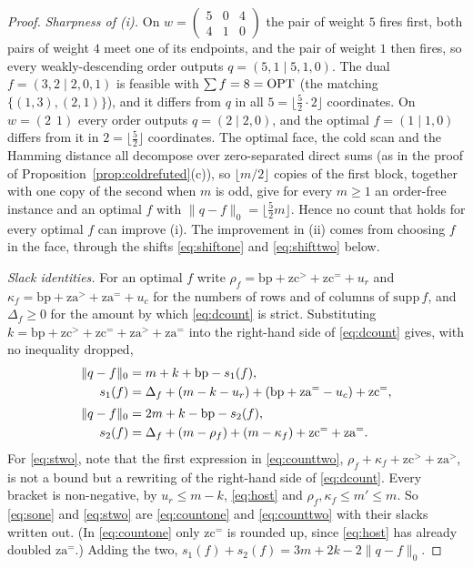 \begin{proof}
\emph{Sharpness of (i).} On
$w = \left(\begin{smallmatrix} 5&0&4\\ 4&1&0 \end{smallmatrix}\right)$ the pair of weight $5$ fires
first, both pairs of weight $4$ meet one of its endpoints, and the pair of weight $1$ then fires, so
every weakly-descending order outputs $q = (5,1 \mid 5,1,0)$. The dual $f = (3,2 \mid 2,0,1)$ is
feasible with $\sum f = 8 = \mathrm{OPT}$ (the matching $\{(1,3),(2,1)\}$), and it differs from $q$ in all
$5 = \lfloor \tfrac52 \cdot 2 \rfloor$ coordinates. On $w = (2\ \ 1)$ every order outputs
$q = (2 \mid 2, 0)$, and the optimal $f = (1 \mid 1, 0)$ differs from it in
$2 = \lfloor \tfrac52 \rfloor$ coordinates. The optimal face, the cold scan and the Hamming distance
all decompose over zero-separated direct sums (as in the proof of
Proposition~\ref{prop:coldrefuted}(c)), so $\lfloor m/2 \rfloor$ copies of the first block, together
with one copy of the second when $m$ is odd, give for every $m \ge 1$ an order-free instance and an
optimal $f$ with $\|q-f\|_0 = \lfloor \tfrac52 m \rfloor$. Hence no count that holds for every
optimal $f$ can improve (i). The improvement in (ii) comes from choosing $f$ in the face, through
the shifts \eqref{eq:shiftone} and \eqref{eq:shifttwo} below.

\emph{Slack identities.} For an optimal $f$ write
$\rho_f = \mathrm{bp}+\mathrm{zc}^>+\mathrm{zc}^=+u_r$ and
$\kappa_f = \mathrm{bp}+\mathrm{za}^>+\mathrm{za}^=+u_c$ for the numbers of rows and of columns of
$\mathrm{supp}\, f$, and $\Delta_f \ge 0$ for the amount by which \eqref{eq:dcount} is strict.
Substituting $k = \mathrm{bp}+\mathrm{zc}^>+\mathrm{zc}^=+\mathrm{za}^>+\mathrm{za}^=$ into the
right-hand side of \eqref{eq:dcount} gives, with no inequality dropped,
\begin{align}
  \|q-f\|_0 &= m+k+\mathrm{bp} - s_1(f), \notag\\
  s_1(f) &= \Delta_f + (m-k-u_r) + (\mathrm{bp}+\mathrm{za}^=-u_c) + \mathrm{zc}^= ,
  \label{eq:sone}\\[2pt]
  \|q-f\|_0 &= 2m+k-\mathrm{bp} - s_2(f), \notag\\
  s_2(f) &= \Delta_f + (m-\rho_f) + (m-\kappa_f) + \mathrm{zc}^= + \mathrm{za}^= .
  \label{eq:stwo}
\end{align}
For \eqref{eq:stwo}, note that the first expression in \eqref{eq:counttwo},
$\rho_f + \kappa_f + \mathrm{zc}^> + \mathrm{za}^>$, is not a bound but a rewriting of the
right-hand side of \eqref{eq:dcount}. Every bracket is non-negative, by $u_r \le m-k$,
\eqref{eq:host} and $\rho_f, \kappa_f \le m' \le m$. So \eqref{eq:sone} and \eqref{eq:stwo} are
\eqref{eq:countone} and \eqref{eq:counttwo} with their slacks written out. (In
\eqref{eq:countone} only $\mathrm{zc}^=$ is rounded up, since \eqref{eq:host} has already
doubled $\mathrm{za}^=$.) Adding the two, $s_1(f)+s_2(f) = 3m+2k-2\|q-f\|_0$.


\end{proof}

